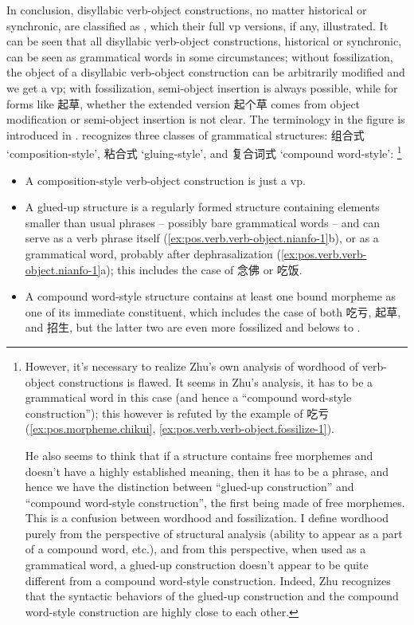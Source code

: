 \documentclass[UTF8, a4paper, oneside, scheme=plain, 12pt]{ctexrep}
\newcommand*{\citepages}[1]{pp.~{#1}}
\newcommand{\translate}[1]{`#1'}
\begin{document}
In conclusion, 
disyllabic verb-object constructions, no matter historical or synchronic, 
are classified as ,
which their full \acs{vp} versions, if any, illustrated. 
It can be seen that all disyllabic verb-object constructions, 
historical or synchronic, 
can be seen as grammatical words in some circumstances; 
without fossilization, 
the object of a disyllabic verb-object construction 
can be arbitrarily modified and we get a \acs{vp}; 
with fossilization, 
semi-object insertion is always possible, 
while for forms like 起草, 
whether the extended version 起个草
comes from object modification or semi-object insertion 
is not clear. 
The terminology in the figure
is introduced in \citet[\citepages{128-129}]{zhudexigrammar}.
\citet{zhudexigrammar} recognizes three classes of grammatical structures:  
组合式 \translate{composition-style}, 粘合式 \translate{gluing-style}, 
and 复合词式 \translate{compound word-style}:%
\footnote{
    However, it's necessary to realize Zhu's own analysis 
    of wordhood of verb-object constructions 
    is flawed. 
    It seems in Zhu's analysis, 
    it has to be a grammatical word in this case (and hence a ``compound word-style construction''); 
    this however is refuted by the example of 吃亏 
    (\ref{ex:pos.morpheme.chikui}, \ref{ex:pos.verb.verb-object.fossilize-1}).

    He also seems to think that if a structure contains free morphemes 
    and doesn't have a highly established meaning, 
    then it has to be a phrase,
    and hence we have the distinction 
    between ``glued-up construction'' and ``compound word-style construction'',
    the first being made of free morphemes. 
    This is a confusion between wordhood and fossilization.
    I define wordhood purely from the perspective of structural analysis 
    (ability to appear as a part of a compound word, etc.), 
    and from this perspective, 
    when used as a grammatical word, 
    a glued-up construction doesn't appear to be quite different 
    from a compound word-style construction. 
    Indeed, Zhu recognizes that the syntactic behaviors of 
    the glued-up construction and the compound word-style construction 
    are highly close to each other.
}
\begin{itemize}
    \item A composition-style verb-object construction is just a \acs{vp}.
    \item A glued-up structure 
    is a regularly formed structure 
    containing elements smaller than usual phrases 
    -- possibly bare grammatical words --
    and can serve as a verb phrase itself
    (\ref{ex:pos.verb.verb-object.nianfo-1}b),
    or as a grammatical word, 
    probably after dephrasalization 
    (\ref{ex:pos.verb.verb-object.nianfo-1}a); 
    this includes the case of 念佛 or 吃饭.
    \item A compound word-style structure contains 
    at least one bound morpheme as one of its immediate constituent, 
    which includes the case of both 吃亏, 起草, and 招生,
    but the latter two are even more fossilized
    and belows to .
\end{itemize}
\end{document}
